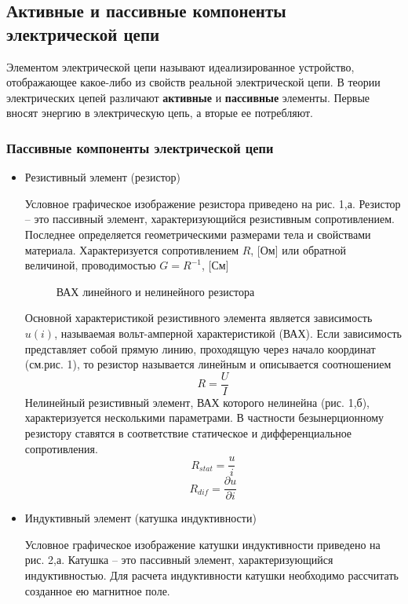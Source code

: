 \subsection{Активные и пассивные компоненты электрической цепи}

	Элементом электрической цепи называют идеализированное устройство, отображающее какое-либо из свойств реальной электрической цепи. В теории электрических цепей различают {\bfseries активные} и {\bfseries пассивные} элементы. Первые вносят энергию в электрическую цепь, а вторые ее потребляют.

\subsubsection{Пассивные компоненты электрической цепи}
\begin{itemize}
\item Резистивный элемент (резистор)

	Условное графическое изображение резистора приведено на рис. 1,а. Резистор – это пассивный элемент, характеризующийся резистивным сопротивлением. Последнее определяется геометрическими размерами тела и свойствами материала. Характеризуется сопротивлением $ R $, [Ом]  или обратной величиной, проводимостью $G = R^{-1}  $, [См] 

\begin{center}
	\begin{figure}[h!]
		\caption{ВАХ линейного и нелинейного резистора}	
	\end{figure}
\end{center}
	Основной характеристикой резистивного элемента является зависимость $u(i)$, называемая вольт-амперной характеристикой (ВАХ). Если зависимость представляет собой прямую линию, проходящую через начало координат (см.рис. 1), то резистор называется линейным и описывается соотношением
$$ R = \frac{U}{I} $$
	Нелинейный резистивный элемент, ВАХ которого нелинейна (рис. 1,б), характеризуется несколькими параметрами. В частности безынерционному резистору ставятся в соответствие статическое и дифференциальное сопротивления.
$$ R_{stat} = \frac{u}{i} $$
$$ R_{dif} = \frac{\partial u}{\partial i} $$
\item Индуктивный элемент (катушка индуктивности)

	Условное графическое изображение катушки индуктивности приведено на рис. 2,а. Катушка – это пассивный элемент, характеризующийся индуктивностью. Для расчета индуктивности катушки необходимо рассчитать созданное ею магнитное поле.


\end{itemize}
